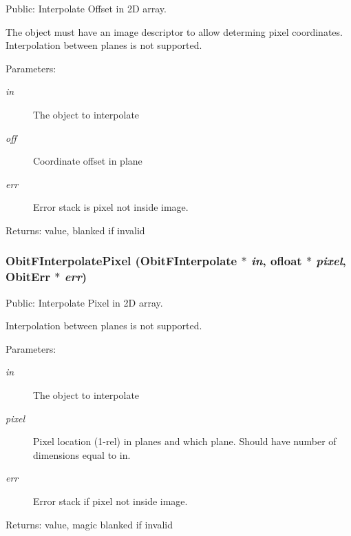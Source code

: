 Public: Interpolate Offset in 2D array. 

The object must have an image descriptor to allow determing pixel coordinates. Interpolation between planes is not supported. \begin{Desc}
\item[Parameters:]
\begin{description}
\item[{\em in}]The object to interpolate \item[{\em off}]Coordinate offset in plane \item[{\em err}]Error stack is pixel not inside image. \end{description}
\end{Desc}
\begin{Desc}
\item[Returns:]value, blanked if invalid \end{Desc}
\subsubsection{ Obit\-FInterpolate\-Pixel ({\bf Obit\-FInterpolate} $\ast$ {\em in}, {\bf ofloat} $\ast$ {\em pixel}, {\bf Obit\-Err} $\ast$ {\em err})}\label{ObitFInterpolate_8h_a10}


Public: Interpolate Pixel in 2D array. 

Interpolation between planes is not supported. \begin{Desc}
\item[Parameters:]
\begin{description}
\item[{\em in}]The object to interpolate \item[{\em pixel}]Pixel location (1-rel) in planes and which plane. Should have number of dimensions equal to in. \item[{\em err}]Error stack if pixel not inside image. \end{description}
\end{Desc}
\begin{Desc}
\item[Returns:]value, magic blanked if invalid \end{Desc}
